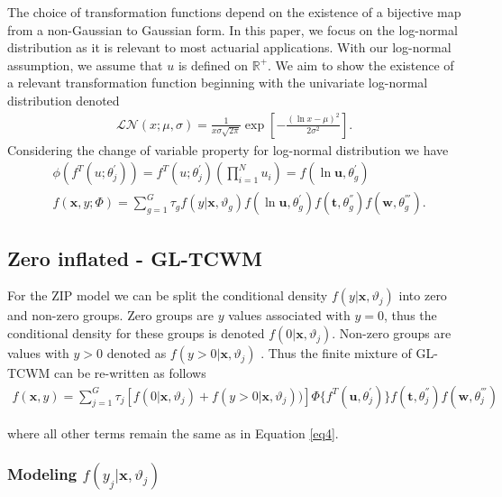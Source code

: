 \documentclass[11pt,letterpaper]{article}
\numberwithin{equation}{section}
\numberwithin{equation}{section}
\numberwithin{equation}{section}
\begin{document}
The choice of transformation functions depend on the existence of a bijective map from a non-Gaussian to Gaussian form. In this paper, we focus on the log-normal distribution as it is relevant to most actuarial applications. With our log-normal assumption, we assume that $u$ is defined on $\mathbb{R}^+$. We aim to show the existence of a relevant transformation function beginning with the univariate log-normal distribution denoted 
\begin{align}
\mathcal{LN}(x; \mu, \sigma) = \frac{1}{x\sigma\sqrt{2\pi}}\exp\left[-\frac{(\ln x - \mu)^2}{2\sigma^2}	\right].\label{eq6}
 \end{align}
Considering the change of variable property for log-normal distribution we have
\begin{align} & \phi (f^T(u;\theta_j^{'})) = f^T(u;\theta_j^{'})  (\prod_{i=1}^{N}u_{i}) = f(\ln \bm{u},\theta_g^{'})  \label{eq7} \\ 
 &f(\bm x, y; \Phi) = \sum_{g=1}^{G} \tau_g f(y|\bm{x},\vartheta_g)f(\ln \bm{u},\theta_g^{'})f(\bm{t},\theta_g^{''})f(\bm{w},\theta_g^{'''}).
\label{eq8}
\end{align}

\subsection{Zero inflated - GL-TCWM}%

For the ZIP model we can be split the conditional density $f(y|\bm{x},\vartheta_j)$ into zero and non-zero groups.%
Zero groups are $y$ values associated with $y= 0$, thus the conditional density for these groups is denoted $f(0|\bm{x},\vartheta_{j})$. Non-zero groups are values with $y > 0$ denoted as $f(y > 0|\bm{x},\vartheta_{j})$ . Thus the finite mixture of GL-TCWM can be re-written as follows 
 \begin{align}
 f(\bm x, y)= \sum_{j=1}^{G} \tau_j \left[ f(0|\bm{x},\vartheta_{j} ) +  f(y > 0|\bm{x} ,\vartheta_{j})  ) \right]    \Phi\{f^{T}(\bm{u},\theta_{j}^{'})\}f(\bm{t},\theta_{j}^{''})f(\bm{w},\theta_{j}^{'''})
\end{align}

where all other terms remain the same as in Equation  \ref{eq4}.


\subsubsection{Modeling $f(y_j|\bm{x},\vartheta_{j})$  }
\end{document}
